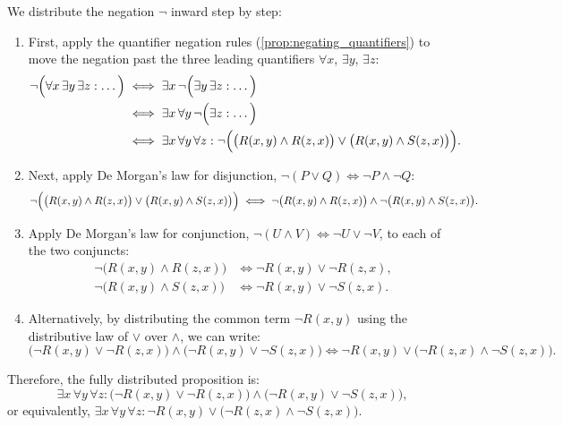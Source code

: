 \begin{exercisesolution*}
\label{sol:logic_distribute_negation}
We distribute the negation $\neg$ inward step by step:
\begin{enumerate}[label=\textbf{Step \arabic*.}]
    \item First, apply the quantifier negation rules (\cref{prop:negating_quantifiers}) to move the negation past the three leading quantifiers $\forall x$, $\exists y$, $\exists z$:
    \begin{align*}
    \neg \Bigl( \forall x \, \exists y \, \exists z : \dots \Bigr) &\iff \exists x \, \neg \Bigl( \exists y \, \exists z : \dots \Bigr) \\
    &\iff \exists x \, \forall y \, \neg \Bigl( \exists z : \dots \Bigr) \\
    &\iff \exists x \, \forall y \, \forall z : \neg \Bigl( \bigl( R(x, y) \wedge R(z, x) \bigr) \vee \bigl( R(x, y) \wedge S(z, x) \bigr) \Bigr).
    \end{align*}

    \item Next, apply De Morgan's law for disjunction, $\neg(P \vee Q) \iff \neg P \wedge \neg Q$:
    \[
    \neg \Bigl( \bigl( R(x, y) \wedge R(z, x) \bigr) \vee \bigl( R(x, y) \wedge S(z, x) \bigr) \Bigr) \iff \neg \bigl( R(x, y) \wedge R(z, x) \bigr) \wedge \neg \bigl( R(x, y) \wedge S(z, x) \bigr).
    \]

    \item Apply De Morgan's law for conjunction, $\neg(U \wedge V) \iff \neg U \vee \neg V$, to each of the two conjuncts:
    \begin{align*}
    \neg \bigl( R(x, y) \wedge R(z, x) \bigr) &\iff \neg R(x, y) \vee \neg R(z, x), \\
    \neg \bigl( R(x, y) \wedge S(z, x) \bigr) &\iff \neg R(x, y) \vee \neg S(z, x).
    \end{align*}

    \item Alternatively, by distributing the common term $\neg R(x, y)$ using the distributive law of $\vee$ over $\wedge$, we can write:
    \[
    \bigl( \neg R(x, y) \vee \neg R(z, x) \bigr) \wedge \bigl( \neg R(x, y) \vee \neg S(z, x) \bigr) \iff \neg R(x, y) \vee \bigl( \neg R(z, x) \wedge \neg S(z, x) \bigr).
    \]
\end{enumerate}
Therefore, the fully distributed proposition is:
\[
\exists x \, \forall y \, \forall z : \bigl( \neg R(x, y) \vee \neg R(z, x) \bigr) \wedge \bigl( \neg R(x, y) \vee \neg S(z, x) \bigr),
\]
or equivalently, $\exists x \, \forall y \, \forall z : \neg R(x, y) \vee \bigl( \neg R(z, x) \wedge \neg S(z, x) \bigr)$.
\end{exercisesolution*}
